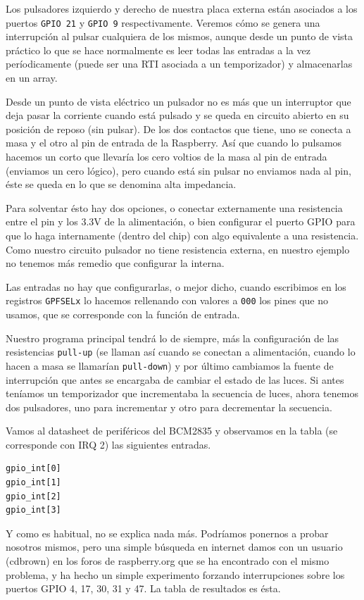 Los pulsadores izquierdo y derecho de nuestra placa externa están asociados a los
puertos {\tt GPIO 21} y {\tt GPIO 9} respectivamente. Veremos cómo se genera una
interrupción al pulsar cualquiera de los mismos, aunque desde un punto de vista
práctico lo que se hace normalmente es leer todas las entradas a la vez períodicamente
(puede ser una RTI asociada a un temporizador) y almacenarlas en un array.

Desde un punto de vista eléctrico un pulsador no es más que un interruptor que deja pasar
la corriente cuando está pulsado y se queda en circuito abierto en su posición de reposo
(sin pulsar). De los dos contactos que tiene, uno se conecta a masa y el otro al pin de
entrada de la Raspberry. Así que cuando lo pulsamos hacemos un corto que llevaría los cero
voltios de la masa al pin de entrada (enviamos un cero lógico), pero cuando está sin pulsar
no enviamos nada al pin, éste se queda en lo que se denomina alta impedancia.

Para solventar ésto hay dos opciones, o conectar externamente una resistencia entre el pin y
los 3.3V de la alimentación, o bien configurar el puerto GPIO para que lo haga internamente
(dentro del chip) con algo equivalente a una resistencia. Como nuestro circuito pulsador no
tiene resistencia externa, en nuestro ejemplo no tenemos más remedio que configurar la interna.

Las entradas no hay que configurarlas, o mejor dicho, cuando escribimos en los registros
{\tt GPFSELx} lo hacemos rellenando con valores a {\tt 000} los pines que no usamos, que se
corresponde con la función de entrada.

Nuestro programa principal tendrá lo de siempre, más la configuración de las resistencias
{\tt pull-up} (se llaman así cuando se conectan a alimentación, cuando lo hacen a masa se
llamarían {\tt pull-down}) y por último cambiamos la fuente de interrupción que antes se
encargaba de cambiar el estado de las luces. Si antes teníamos un temporizador que
incrementaba la secuencia de luces, ahora tenemos dos pulsadores, uno para incrementar y
otro para decrementar la secuencia.

Vamos al datasheet de periféricos del BCM2835 y observamos en la tabla (se corresponde con
IRQ 2) las siguientes entradas.

\begin{lstlisting}
gpio_int[0]
gpio_int[1]
gpio_int[2]
gpio_int[3]
\end{lstlisting}

Y como es habitual, no se explica nada más. Podríamos ponernos a probar nosotros mismos, pero
una simple búsqueda en internet damos con un usuario (cdbrown) en los foros de raspberry.org
que se ha encontrado con el mismo problema, y ha hecho un simple experimento forzando
interrupciones sobre los puertos GPIO 4, 17, 30, 31 y 47. La tabla de resultados es ésta.

